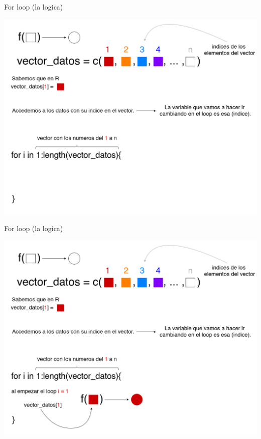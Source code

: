 \documentclass[
  10pt,
  ignorenonframetext,
]{beamer}
\begin{document}
\begin{frame}{For loop (la logica)}
\protect\hypertarget{for-loop-la-logica-3}{}
\begin{center}\includegraphics[width=0.9\linewidth]{images/explicando_forloops_en_r_0d} \end{center}
\end{frame}

\begin{frame}{For loop (la logica)}
\protect\hypertarget{for-loop-la-logica-4}{}
\begin{center}\includegraphics[width=0.9\linewidth]{images/explicando_forloops_en_r_1} \end{center}
\end{frame}
\end{document}
